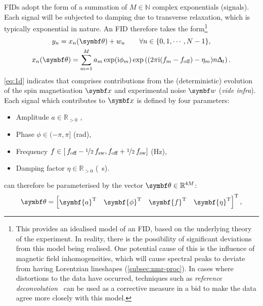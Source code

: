 \acp{FID} adopt the form of a summation of $M \in \mathbb{N}$ complex
exponentials (signals). Each signal will be subjected to damping due to
transverse relaxation, which is typically exponential in nature. An \ac{FID}
therefore takes the form\footnote{
    This provides an idealised model of an \ac{FID}, based on the
    underlying theory of the experiment. In reality, there is the possibility
    of significant deviations from this model being realised. One potential
    cause of this is the influence of magnetic field inhomogeneities, which
    will cause spectral peaks to deviate from having Lorentzian lineshapes
    (\cref{subsec:nmr-proc}). In cases where distortions to the data have
    occurred, techniques such as \emph{reference deconvolution}~\cite{Morris1997}
    can be used as a corrective measure in a bid to make the data agree more
    closely with this model.
}
\begin{subequations}
    \begin{gather}
        y_n = x_n(\bth) + w_n \quad
            \quad \forall n \in \lbrace 0, 1, \cdots, N - 1 \rbrace,
            \label{eq:y=x+w} \\
        x_n(\bth) =
        \sumM \amexpphim \exp\left(
            (2 \pi \iu (f_m - \foff)- \eta_m ) n \Dt
        \right).
        \label{eq:x}
    \end{gather}
    \label{eq:1d}%
\end{subequations}%
\cref{eq:1d} indicates that  comprises contributions from the
(deterministic) evolution of the spin magnetisation $\bx$ and experimental
noise $\bw$ (\emph{vide infra}). Each signal which contributes to $\bx$ is
defined by four parameters:
\begin{itemize}
    \item Amplitude $a \in \mathbb{R}_{>0}$ ,
    \label{pg:param-constraints}
    \item Phase $\phi \in (-\pi, \pi]$ (\unit{\radian}),
    \item Frequency $f \in \left[\hspace*{2pt}f_{\text{off}} - \nicefrac{1}{2} \hspace*{2pt}
        f_{\mathrm{sw}}, f_{\text{off}} + \nicefrac{1}{2} \hspace*{2pt}f_{\mathrm{sw}} \right]$ (\unit{\hertz}),
    \item Damping factor $\eta \in \mathbb{R}_{>0}$ (\unit{\per\second}).
\end{itemize}%
 can therefore be parameterised by the vector $\bth \in
\mathbb{R}^{4M}$:
\begin{equation}
    \bth =
    \begin{bmatrix}
        \symbf{a}\T & \symbf{\phi}\T & \symbf{f}\T & \symbf{\eta}\T
    \end{bmatrix}\T,
\end{equation}
